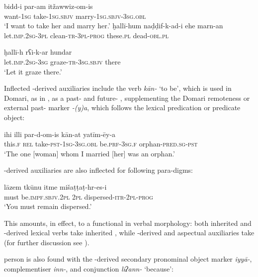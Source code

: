 \documentclass[output=paper]{langsci/langscibook}
\begin{document}
\ex
\gll bidd-i  par-am itžawwiz-om-is\\
     want-\textsc{1sg} take-\textsc{1sg.sbjv} marry-\textsc{1sg.sbjv-3sg.obl}\\
\glt ‘I want to take her and marry her.’
\z
\ex
\ea
\gll ḫallī-hum naḍḍif-k-ad-i ehe marn-an  \\
     let.\textsc{imp.2sg-3pl} clean-\textsc{tr-3pl-prog} these.\textsc{pl} dead-\textsc{obl.pl}\\

\ex
\gll ḫallī-h rʕi-k-ar hundar\\
     let.\textsc{imp.2sg}-\textsc{3sg} graze-\textsc{tr-3sg.sbjv} there\\
\glt ‘Let it graze there.’
\z
\z

Inflected -derived auxiliaries include the  verb \textit{kān-} ‘to be’, which is used in Domari, as in , as a past- and future- , supplementing the Domari remoteness or external past- marker \textit{-(y)a}, which follows the lexical predication or predicate object:

\ea \gll ihi illi par-d-om-is kān-at yatīm-ēy-a\\
     this.\textsc{f} \textsc{rel} take-\textsc{pst-1sg-3sg.obl} be.\textsc{prf-3sg.f} orphan-\textsc{pred.sg-pst}\\
\glt ‘The one [woman] whom I married [her] was an orphan.’ \label{ihi}
\z

\noindent {}-derived auxiliaries are also inflected for  following  para-\linebreak digms:

\ea \gll   lāzem tkūnu itme mišaṭṭaṭ-hr-es-i\\
       must be.\textsc{impf.sbjv.2pl} \textsc{2pl} dispersed-\textsc{itr-2pl-prog}\\
\glt   ‘You must remain dispersed.’
\z

This amounts, in effect, to a functional  in verbal morphology: both inherited and -derived lexical verbs take inherited  , while -derived  and aspectual auxiliaries take   (for further discussion see \citealt{Matras2015}).

 person  is also found with the -derived secondary pronominal object marker \textit{iyyā-}, complementiser \textit{inn-}, and conjunction \textit{liʔann-} ‘because’:
\end{document}

